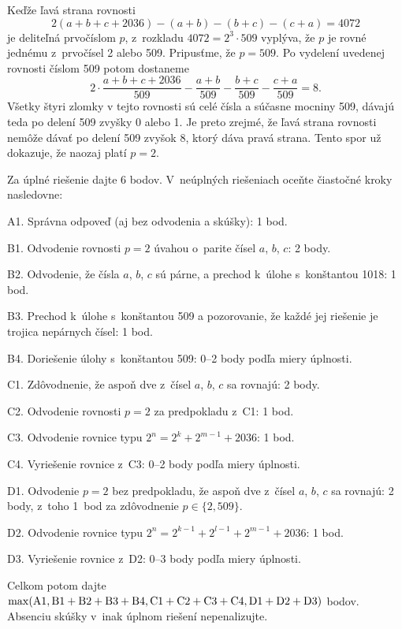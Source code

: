 {Keďže ľavá strana rovnosti
$$
2(a+b+c+2036)-(a+b)-(b+c)-(c+a)=4072
$$
je deliteľná prvočíslom $p$, z~rozkladu $4072=2^3\cdot509$ vyplýva,
že $p$ je rovné jednému z~prvočísel 2 alebo 509. Pripusťme, že
$p=509$. Po vydelení uvedenej rovnosti číslom 509 potom dostaneme
$$
2\cdot\frac{a+b+c+2036}{509}-\frac{a+b}{509}-\frac{b+c}{509}
-\frac{c+a}{509}=8.
$$
Všetky štyri zlomky v tejto rovnosti sú celé čísla a súčasne
mocniny 509, dávajú teda po delení 509 zvyšky 0 alebo 1. Je preto
zrejmé, že ľavá strana rovnosti nemôže dávať po delení 509
zvyšok 8, ktorý dáva pravá strana. Tento spor už dokazuje, že
naozaj platí $p=2$.

\schemaABC
Za úplné riešenie dajte 6 bodov. V~neúplných riešeniach oceňte
čiastočné kroky nasledovne:
\item{A1.} Správna odpoveď (aj bez odvodenia a skúšky): 1 bod.
\item{B1.} Odvodenie rovnosti $p=2$ úvahou o~parite čísel $a$, $b$, $c$: 2 body.
\item{B2.} Odvodenie, že čísla $a$, $b$, $c$ sú párne, a prechod k~úlohe s~konštantou 1018: 1 bod.
\item{B3.} Prechod k~úlohe s~konštantou 509 a pozorovanie, že každé jej riešenie je trojica nepárnych čísel: 1 bod.
\item{B4.} Doriešenie úlohy s~konštantou 509: 0--2 body podľa miery úplnosti.
\item{C1.} Zdôvodnenie, že aspoň dve z~čísel $a$, $b$, $c$ sa rovnajú: 2 body.
\item{C2.} Odvodenie rovnosti $p=2$ za predpokladu z~C1: 1 bod.
\item{C3.} Odvodenie rovnice typu $2^n = 2^k + 2^{m-1}+2036$: 1 bod.
\item{C4.} Vyriešenie rovnice z~C3: 0--2 body podľa miery úplnosti.
\item{D1.} Odvodenie $p=2$ bez predpokladu, že aspoň dve z~čísel $a$, $b$, $c$ sa rovnajú: 2 body, z~toho 1~bod za zdôvodnenie $p\in \{2,509\}$.
\item{D2.} Odvodenie rovnice typu $2^n = 2^{k-1}+2^{l-1}+ 2^{m-1}+2036$: 1 bod.
\item{D3.} Vyriešenie rovnice z~D2: 0--3 body podľa miery úplnosti.

\noindent
Celkom potom dajte $\rm\max(A1,B1+B2+B3+B4,C1+C2+C3+C4,D1+D2+D3)$ bodov.
Absenciu skúšky v~inak úplnom riešení nepenalizujte.
\endschema

}

